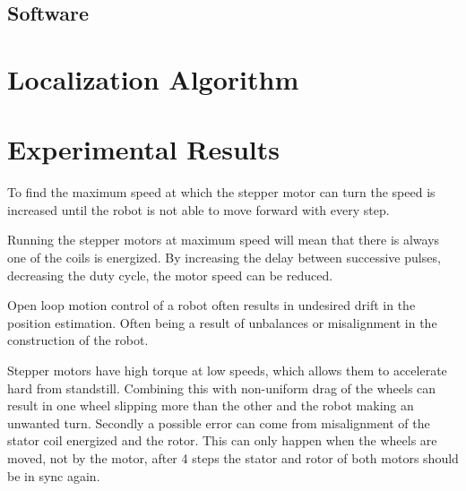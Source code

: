 \documentclass[letterpaper, 10 pt, conference]{ieeeconf}  %
\begin{document}
\subsection{Software}




\section{Localization Algorithm}






\section{Experimental Results}


To find the maximum speed at which the stepper motor can turn the speed is increased until the robot is not able to move forward with every step.

Running the stepper motors at maximum speed will mean that there is always one of the coils is energized.
By increasing the delay between successive pulses, decreasing the duty cycle, the motor speed can be reduced. 



Open loop motion control of a robot often results in undesired drift in the position estimation.
Often being a result of unbalances or misalignment in the construction of the robot.

Stepper motors have high torque at low speeds, which allows them to accelerate hard from standstill.
Combining this with non-uniform drag of the wheels can result in one wheel slipping more than the other and the robot making an unwanted turn. 
Secondly a possible error can come from misalignment of the stator coil energized and the rotor.
This can only happen when the wheels are moved, not by the motor, after 4 steps the stator and rotor of both motors should be in sync again.
\end{document}
